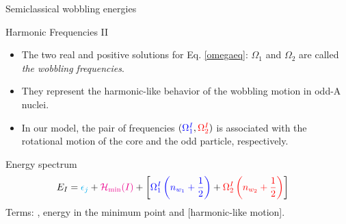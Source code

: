 \documentclass{beamer}
\begin{document}
\begin{frame}{Semiclassical wobbling energies}
\begin{block}{Harmonic Frequencies II}
\begin{itemize}
    \item The two real and positive solutions for Eq. \ref{omegaeq}: $\Omega_1$ and $\Omega_2$ are called \emph{the wobbling frequencies}.
    \item They represent the harmonic-like behavior of the wobbling motion in odd-A nuclei.
  \item In our model, the pair of frequencies $({\color{blue}\Omega_1^I},{\color{red}\Omega_{2}^I})$ is associated with the rotational motion of the {\color{blue}core} and the {\color{red}odd particle}, respectively.
\end{itemize}
\end{block}
\begin{alertblock}{Energy spectrum}
\begin{align}
    E_I&={\color{cyan}\epsilon_{j}}+{\color{magenta}\mathcal{H}_\text{min}(I)}+\left[{\color{blue}\Omega_1^I\left(n_{w_1}+\frac{1}{2}\right)}+{\color{red}\Omega_2^I\left(n_{w_2}+\frac{1}{2}\right)}\right]
  \end{align} 
  Terms: {\color{cyan}{single particle energy}}, {\color{magenta}energy in the minimum point} and [harmonic-like motion].
\end{alertblock}
\end{frame}
\end{document}
